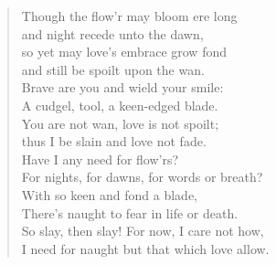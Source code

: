 \begin{verse}
  Though the flow’r may bloom ere long\\
  \vin and night recede unto the dawn,\\
  so yet may love’s embrace grow fond\\
  \vin and still be spoilt upon the wan.\\
  Brave are you and wield your smile:\\
  \vin A cudgel, tool, a keen-edged blade.\\
  You are not wan, love is not spoilt;\\
  \vin thus I be slain and love not fade.\\
  Have I any need for flow'rs?\\
  \vin For nights, for dawns, for words or breath?\\
  With so keen and fond a blade,\\
  \vin There's naught to fear in life or death.\\
  \vin \vin So slay, then slay! For now, I care not how,\\
  \vin \vin I need for naught but that which love allow.
\end{verse}
